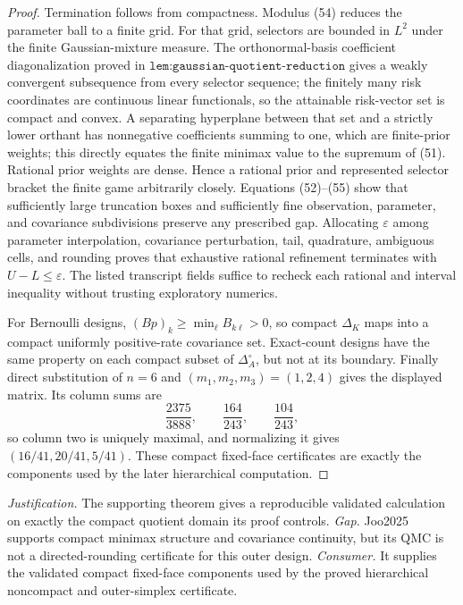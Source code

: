 \documentclass{article}
\begin{document}
\begin{proof}
Termination follows from compactness.  Modulus (54) reduces the parameter ball to a finite grid.  For that grid, selectors are bounded in \(L^2\) under the finite Gaussian-mixture measure.  The orthonormal-basis coefficient diagonalization proved in \(\texttt{lem:gaussian-quotient-reduction}\) gives a weakly convergent subsequence from every selector sequence; the finitely many risk coordinates are continuous linear functionals, so the attainable risk-vector set is compact and convex.  A separating hyperplane between that set and a strictly lower orthant has nonnegative coefficients summing to one, which are finite-prior weights; this directly equates the finite minimax value to the supremum of (51).  Rational prior weights are dense.  Hence a rational prior and represented selector bracket the finite game arbitrarily closely.  Equations (52)--(55) show that sufficiently large truncation boxes and sufficiently fine observation, parameter, and covariance subdivisions preserve any prescribed gap.  Allocating \(\varepsilon\) among parameter interpolation, covariance perturbation, tail, quadrature, ambiguous cells, and rounding proves that exhaustive rational refinement terminates with \(U-L\leq\varepsilon\).  The listed transcript fields suffice to recheck each rational and interval inequality without trusting exploratory numerics.

For Bernoulli designs, \((Bp)_k\geq\min_\ell B_{k\ell}>0\), so compact \(\Delta_K\) maps into a compact uniformly positive-rate covariance set.  Exact-count designs have the same property on each compact subset of \(\Delta_A^\circ\), but not at its boundary.  Finally direct substitution of \(n=6\) and \((m_1,m_2,m_3)=(1,2,4)\) gives the displayed matrix.  Its column sums are
\[
\frac{2375}{3888},\qquad\frac{164}{243},\qquad\frac{104}{243},
\]
so column two is uniquely maximal, and normalizing it gives \((16/41,20/41,5/41)\).  These compact fixed-face certificates are exactly the components used by the later hierarchical computation.
\end{proof}
\par\smallskip\noindent \textit{Justification.} The supporting theorem gives a reproducible validated calculation on exactly the compact quotient domain its proof controls. \textit{Gap.} Joo2025 supports compact minimax structure and covariance continuity, but its QMC is not a directed-rounding certificate for this outer design. \textit{Consumer.} It supplies the validated compact fixed-face components used by the proved hierarchical noncompact and outer-simplex certificate.
\end{document}
